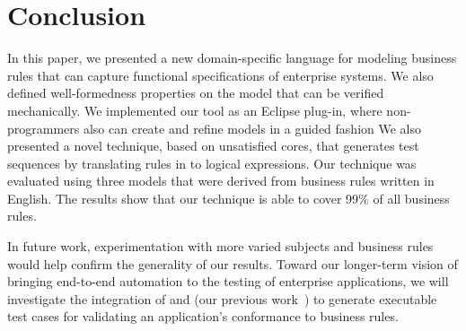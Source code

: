 \section{Conclusion}

In this paper, we presented a new domain-specific language for modeling business
rules that can capture functional specifications of enterprise systems. We also
defined well-formedness properties on the model that can be verified
mechanically. We implemented our tool as an Eclipse plug-in, where
non-programmers also can create and refine models in a guided fashion We also
presented a novel technique, based on unsatisfied cores, that generates test
sequences by translating rules in to logical expressions.
Our technique was evaluated using three models that were derived from business
rules written in English. The results show that our technique is able to cover
99\% of all business rules.

In future work, experimentation with more varied subjects and business rules would help confirm the
generality of our results. Toward our longer-term vision of bringing end-to-end
automation to the testing of enterprise applications, we will investigate the
integration of \tool{} and \wateg{} (our previous
work~\cite{Thummalapenta:2013}) to generate executable test cases for validating
an application's conformance to business rules.

